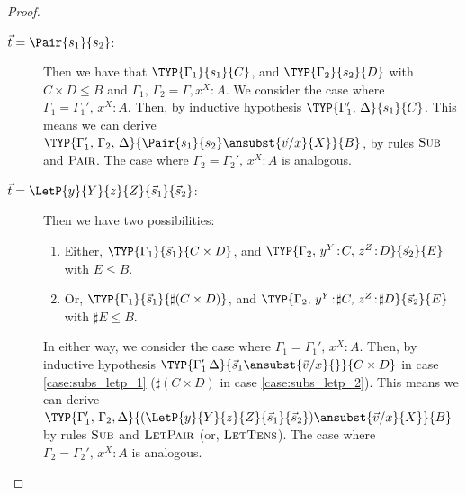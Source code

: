 \begin{proof}
\begin{description}
    \item[$\vec{t}=\Pair{s_1}{s_2}$:] Then we have that $\TYP{\Gamma_1}{s_1}{C}$, and $\TYP{\Gamma_2}{s_2}{D}$ with $C\times D\leq B$ and $\Gamma_1,\,\Gamma_2 = \Gamma,x^{X}\!:\!A$. We consider the case where $\Gamma_1 = \Gamma_1',\,x^{X}\!:\!A$. Then, by inductive hypothesis $\TYP{\Gamma_1',\,\Delta}{s_1}{C}$. This means we can derive $\TYP{\Gamma_1',\,\Gamma_2,\,\Delta}{\Pair{s_1}{s_2}\ansubst{\vec{v}/x}{X}}{B}$, by rules $\textsc{Sub}$ and $\textsc{Pair}$. The case where $\Gamma_2 = \Gamma_2',\,x^{X}\!:\!A$ is analogous.
    
    \item[$\vec{t}=\LetP{y}{Y}{z}{Z}{\vec{s}_{1}}{\vec{s}_{2}}$:] Then we have two possibilities:
      \begin{enumerate}
        \item\label{case:subs_letp_1} Either, $\TYP{\Gamma_1}{\vec{s}_{1}}{C\times D}$, and $\TYP{\Gamma_2,\,y^{Y}\!:\!C,\,z^{Z}\!:\!D}{\vec{s}_{2}}{E}$ with $E\leq B$.
        \item\label{case:subs_letp_2} Or, $\TYP{\Gamma_1}{\vec{s}_{1}}{\sharp(C\times D)}$, and $\TYP{\Gamma_2,\,y^{Y}\!:\!\sharp{C},\,z^{Z}\!:\!\sharp{D}}{\vec{s}_{2}}{E}$ with $\sharp E\leq B$.
      \end{enumerate}
      In either way, we consider the case where $\Gamma_1 = \Gamma_1',\,x^{X}\!:\!A$. Then, by inductive hypothesis $\TYP{\Gamma_1'\,\Delta}{\vec{s}_{1}\ansubst{\vec{v}/x}{}}{C\times D}$ in case \ref{case:subs_letp_1} ($\sharp (C\times D)$ in case \ref{case:subs_letp_2}). This means we can derive $\TYP{\Gamma_1',\,\Gamma_2,\Delta}{(\LetP{y}{Y}{z}{Z}{\vec{s}_{1}}{\vec{s}_{2}})\ansubst{\vec{v}/x}{X}}{B}$ by rules $\textsc{Sub}$ and $\textsc{LetPair}$ (or, $\textsc{LetTens}$). The case where $\Gamma_2 = \Gamma_2',\,x^{X}\!:\!A$ is analogous.


\end{description}
\end{proof}
